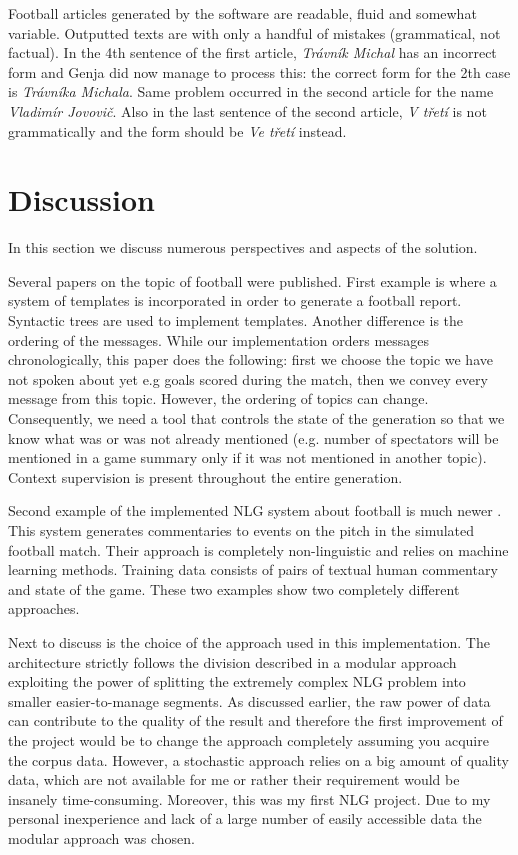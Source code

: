 Football articles generated by the software are readable, fluid and somewhat variable. Outputted texts are with only a handful of mistakes (grammatical, not factual). In the 4th sentence of the first article, \textit{Trávník Michal} has an incorrect form and Genja did now manage to process this: the correct form for the 2th case is \textit{Trávníka Michala}. Same problem occurred in the second article for the name \textit{Vladimír Jovovič}. Also in the last sentence of the second article, \textit{V třetí} is not grammatically and the form should be \textit{Ve třetí} instead. 

\section{Discussion}
In this section we discuss numerous perspectives and aspects of the solution.

Several papers on the topic of football were published. First example is \cite{et1997generation} where a system of templates is incorporated in order to generate a  football report. Syntactic trees are used to implement templates. Another difference is the ordering of the messages. While our implementation orders messages chronologically, this paper does the following: first we choose the topic we have not spoken about yet e.g goals scored during the match, then we convey every message from this topic.  However, the ordering of topics can change. Consequently, we need a tool that controls the state of the generation so that we know what was or was not already mentioned (e.g. number of spectators will be mentioned in a game summary only if it was not mentioned in another topic). Context supervision is present throughout the entire generation.

Second example of the implemented NLG system about football is much newer \cite{chen2008learning}. This system generates commentaries to events on the pitch in the simulated football match. Their approach is completely non-linguistic and relies on machine learning methods. Training data consists of pairs of textual human commentary and state of the game. These two examples show two completely different approaches.

Next to discuss is the choice of the approach used in this implementation. The architecture strictly follows the division described in a modular approach exploiting the power of splitting the extremely complex NLG problem into smaller easier-to-manage segments. As discussed earlier, the raw power of data can contribute to the quality of the result and therefore the first improvement of the project would be to change the approach completely assuming you acquire the corpus data. However, a stochastic approach relies on a big amount of quality data, which are not available for me or rather their requirement would be insanely time-consuming. Moreover, this was my first NLG project. Due to my personal inexperience and lack of a large number of easily accessible data the modular approach was chosen.

